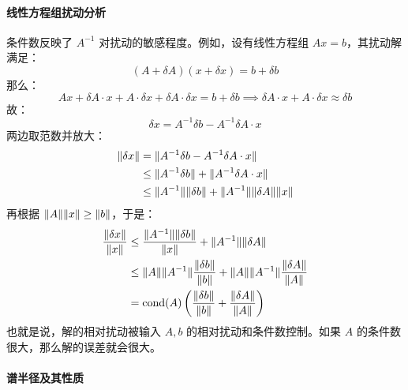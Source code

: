 \paragraph{线性方程组扰动分析}
条件数反映了 $A^{-1}$ 对扰动的敏感程度。例如，设有线性方程组 $Ax=b$，其扰动解满足：
\[
    (A+\delta A)(x+\delta x)=b+\delta b
\]
那么：
\[
    Ax+\delta A\cdot x+A\cdot \delta x+\delta A\cdot \delta x=b+\delta b\implies \delta A\cdot x+A\cdot \delta x\approx\delta b
\]
故：
\[
    \delta x=A^{-1}\delta b-A^{-1}\delta A\cdot x
\]
两边取范数并放大：
\begin{align*}
    \Vert\delta x\Vert&=\Vert A^{-1}\delta b-A^{-1}\delta A\cdot x\Vert\\
    &\leq\Vert A^{-1}\delta b\Vert+\Vert A^{-1}\delta A\cdot x\Vert\\
    &\leq\Vert A^{-1}\Vert\Vert\delta b\Vert+\Vert A^{-1}\Vert\Vert\delta A\Vert\Vert x\Vert
\end{align*}
再根据 $\Vert A\Vert\Vert x\Vert\geq\Vert b\Vert$，于是：
\begin{align*}
    \frac{\Vert\delta x\Vert}{\Vert x\Vert}&\leq\frac{\Vert A^{-1}\Vert\Vert\delta b\Vert}{\Vert x\Vert}+\Vert A^{-1}\Vert\Vert\delta A\Vert\\
    &\leq\Vert A\Vert\Vert A^{-1}\Vert\frac{\Vert\delta b\Vert}{\Vert b\Vert}+\Vert A\Vert\Vert A^{-1}\Vert\frac{\Vert\delta A\Vert}{\Vert A\Vert}\\
    &=\text{cond}(A)\left(\frac{\Vert\delta b\Vert}{\Vert b\Vert}+\frac{\Vert\delta A\Vert}{\Vert A\Vert}\right)
\end{align*}
也就是说，解的相对扰动被输入 $A,b$ 的相对扰动和条件数控制。如果 $A$ 的条件数很大，那么解的误差就会很大。

\paragraph{谱半径及其性质}

